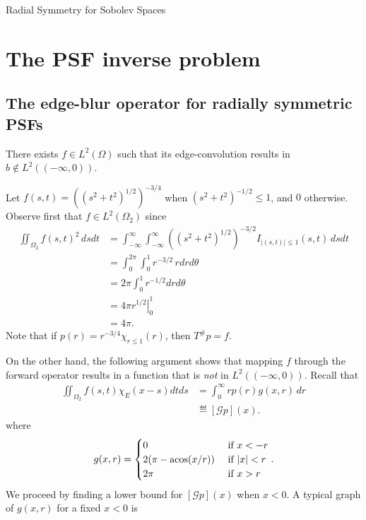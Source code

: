 \begin{chapter}{Radial Symmetry for Sobolev Spaces}
\section{The PSF inverse problem}
\subsection{The edge-blur operator for radially symmetric PSFs}
\begin{prop}
  There exists $f \in L^2(\Omega)$ such that its edge-convolution results in $b\not\in L^2((-\infty,0))$.
\end{prop}
Let $f(s,t) = \left((s^2 + t^2)^{1/2}\right)^{-3/4}$ when $(s^2+t^2)^{-1/2} \le 1$, and $0$ otherwise. 
Observe first that $f \in L^2(\Omega_2)$ since 
\begin{align}
  \iint_{\Omega_2} f(s,t)^2\,dsdt
    &= \int_{-\infty}^\infty\int_{-\infty}^\infty \left((s^2+t^2)^{1/2}\right)^{-3/2}  I_{|(s,t)|\le 1}(s,t)\,dsdt \\
    &= \int_0^{2\pi}\int_0^1 r^{-3/2} \,rdrd\theta \\
    &= 2\pi\int_0^1 r^{-1/2} drd\theta \\
    &= \left. 4\pi r^{1/2}\right|_0^1  \\
    &= 4\pi. 
\end{align}
Note that if $p(r) = r^{-3/4} \chi_{r\le 1}(r)$, then $T^\# p = f$.

On the other hand, the following argument shows that mapping $f$ through the forward operator results in a function that is \emph{not} in $L^2((-\infty,0))$.
Recall that 
\begin{align}
  \iint_{\Omega_2} f(s,t) \chi_{E}(x-s)dtds
    &= \int_0^\infty r p(r)g(x,r)\,dr\\
    &\eqdef [\mathcal Gp](x).
\end{align}
where
\begin{equation}
  g(x,r) = \begin{cases}
    0 &\text{ if } x < - r\\
    2(\pi - \operatorname*{acos}(x/r)) &\text{ if } |x| < r\\
    2\pi & \text{ if } x> r
  \end{cases}.
  \label{g_form}
\end{equation}
We proceed by finding a lower bound for $[\mathcal Gp](x)$ when $x < 0$. 
A typical graph of $g(x,r)$ for a fixed $x<0$ is 

\end{chapter}
